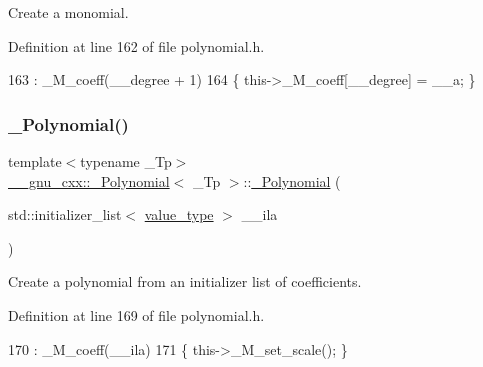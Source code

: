 Create a monomial. 

Definition at line 162 of file polynomial.\+h.


\begin{DoxyCode}
163       : \_M\_coeff(\_\_degree + 1)
164       \{ this->\_M\_coeff[\_\_degree] = \_\_a; \}
\end{DoxyCode}
\mbox{\label{class____gnu__cxx_1_1__Polynomial_acc6b7b2a52600f62bf8dee99f2fb787c}} 
\subsubsection{\texorpdfstring{\+\_\+\+Polynomial()}{\_Polynomial()}\hspace{0.1cm}{\footnotesize\ttfamily [6/9]}}
{\footnotesize\ttfamily template$<$typename \+\_\+\+Tp$>$ \\
\hyperlink{class____gnu__cxx_1_1__Polynomial}{\+\_\+\+\_\+gnu\+\_\+cxx\+::\+\_\+\+Polynomial}$<$ \+\_\+\+Tp $>$\+::\hyperlink{class____gnu__cxx_1_1__Polynomial}{\+\_\+\+Polynomial} (\begin{DoxyParamCaption}\item[{std\+::initializer\+\_\+list$<$ \hyperlink{class____gnu__cxx_1_1__Polynomial_a725563351f50e76084a7a016c06f8a53}{value\+\_\+type} $>$}]{\+\_\+\+\_\+ila }\end{DoxyParamCaption})\hspace{0.3cm}{\ttfamily [inline]}}

Create a polynomial from an initializer list of coefficients. 

Definition at line 169 of file polynomial.\+h.


\begin{DoxyCode}
170       : \_M\_coeff(\_\_ila)
171       \{ this->\_M\_set\_scale(); \}
\end{DoxyCode}
\mbox{\label{class____gnu__cxx_1_1__Polynomial_a45589d1d036861179488c44f3029f335}} 
